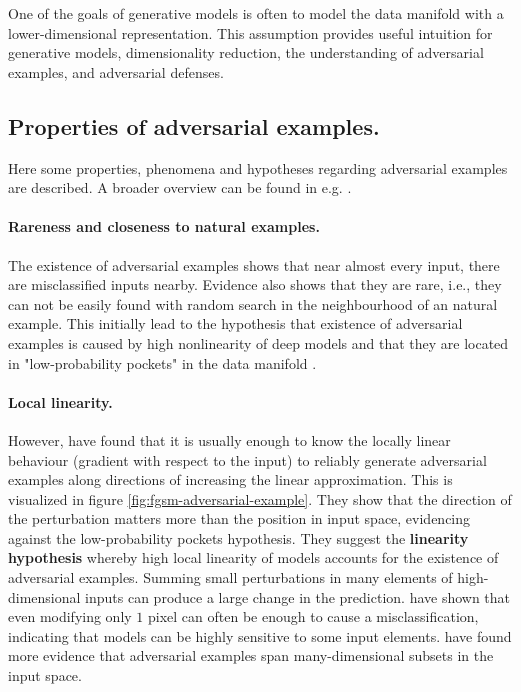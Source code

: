 \documentclass[twocolumn]{article}
\begin{document}
One of the goals of generative models is often to model the data manifold with a lower-dimensional representation. This assumption provides useful intuition for generative models, dimensionality reduction, the understanding of adversarial examples, and adversarial defenses.


\subsection{Properties of adversarial examples.}

Here some properties, phenomena and hypotheses regarding adversarial examples are described. A broader overview can be found in e.g. \citet{Serban:2018:AECCP}.

\paragraph{Rareness and closeness to natural examples.} The existence of adversarial examples shows that near almost every input, there are misclassified inputs nearby. Evidence also shows that they are rare, i.e., they can not be easily found with random search in the neighbourhood of an natural example. This initially lead to the hypothesis that existence of adversarial examples is caused by high nonlinearity of deep models and that they are located in "low-probability pockets" in the data manifold \citep{Szegedy:2013:IPNN}. 

\paragraph{Local linearity.} However, \citet{Goodfellow:2014:EHAE} have found that it is usually enough to know the locally linear behaviour (gradient with respect to the input) to reliably generate adversarial examples along directions of increasing the linear approximation. This is visualized in figure \ref{fig:fgsm-adversarial-example}. They show that the direction of the perturbation matters more than the position in input space, evidencing against the low-probability pockets hypothesis. They suggest the \textbf{linearity hypothesis} whereby high local linearity of models accounts for the existence of adversarial examples. Summing small perturbations in many elements of high-dimensional inputs can produce a large change in the prediction. \citet{Su:2017:OPAFDNN} have shown that even modifying only $1$ pixel can often be enough to cause a misclassification, indicating that models can be highly sensitive to some input elements. \citet{Tabacof:2016:ESAI} have found more evidence that adversarial examples span many-dimensional subsets in the input space.
\end{document}

